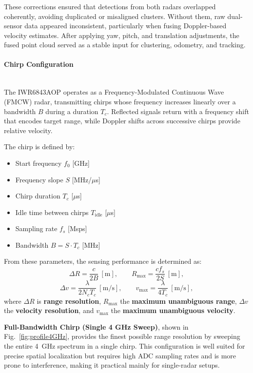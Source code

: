 These corrections ensured that detections from both radars overlapped coherently, avoiding duplicated or misaligned clusters.  
Without them, raw dual-sensor data appeared inconsistent, particularly when fusing Doppler-based velocity estimates.  
After applying yaw, pitch, and translation adjustments, the fused point cloud served as a stable input for clustering, odometry, and tracking.

\vspace{0.5em}
\paragraph{Chirp Configuration}
\hfill
\\
\indent The IWR6843AOP operates as a Frequency-Modulated Continuous Wave (FMCW) radar, transmitting chirps whose frequency increases linearly over a bandwidth $B$ during a duration $T_c$.  
Reflected signals return with a frequency shift that encodes target range, while Doppler shifts across successive chirps provide relative velocity.  

The chirp is defined by:
\begin{itemize}
    \item Start frequency $f_0$ [GHz]
    \item Frequency slope $S$ [MHz/$\mu$s]
    \item Chirp duration $T_c$ [$\mu$s]
    \item Idle time between chirps $T_{\text{idle}}$ [$\mu$s]
    \item Sampling rate $f_s$ [Msps]
    \item Bandwidth $B = S \cdot T_c$ [MHz]
\end{itemize}
From these parameters, the sensing performance is determined as:
\[
    \Delta R = \frac{c}{2B} \ [\text{m}], \qquad
    R_{\max} = \frac{c f_s}{2S} \ [\text{m}],
\]
\[
    \Delta v = \frac{\lambda}{2 N_c T_c} \ [\text{m/s}], \qquad
    v_{\max} = \frac{\lambda}{4 T_c} \ [\text{m/s}],
\]
where $\Delta R$ is \textbf{range resolution}, $R_{\max}$ the \textbf{maximum unambiguous range}, $\Delta v$ the \textbf{velocity resolution}, and $v_{\max}$ the \textbf{maximum unambiguous velocity}.  

\textbf{Full-Bandwidth Chirp (Single 4 GHz Sweep)}, shown in Fig.~\ref{fig:profile4GHz}, provides the finest possible range resolution by sweeping the entire 4~GHz spectrum in a single chirp.  
This configuration is well suited for precise spatial localization but requires high ADC sampling rates and is more prone to interference, making it practical mainly for single-radar setups.  

